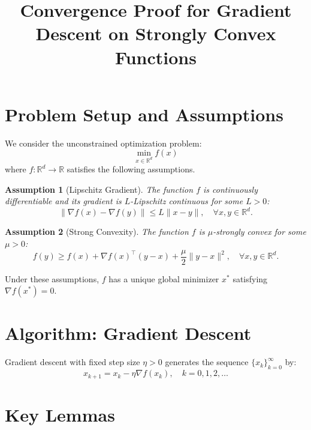 \documentclass{article}
\title{Convergence Proof for Gradient Descent on Strongly Convex Functions}
\author{}
\newtheorem{assumption}{Assumption}
\begin{document}
\maketitle

\section{Problem Setup and Assumptions}

We consider the unconstrained optimization problem:
\begin{equation}
    \min_{x \in \mathbb{R}^d} f(x)
\end{equation}
where $f: \mathbb{R}^d \to \mathbb{R}$ satisfies the following assumptions.

\begin{assumption}[Lipschitz Gradient] \label{assump:lipschitz}
    The function $f$ is continuously differentiable and its gradient is $L$-Lipschitz continuous for some $L > 0$:
    \begin{equation}
        \|\nabla f(x) - \nabla f(y)\| \le L \|x - y\|, \quad \forall x, y \in \mathbb{R}^d.
    \end{equation}
\end{assumption}

\begin{assumption}[Strong Convexity] \label{assump:strong_convex}
    The function $f$ is $\mu$-strongly convex for some $\mu > 0$:
    \begin{equation}
        f(y) \ge f(x) + \nabla f(x)^\top (y - x) + \frac{\mu}{2} \|y - x\|^2, \quad \forall x, y \in \mathbb{R}^d.
    \end{equation}
\end{assumption}

Under these assumptions, $f$ has a unique global minimizer $x^*$ satisfying $\nabla f(x^*) = 0$.

\section{Algorithm: Gradient Descent}

Gradient descent with fixed step size $\eta > 0$ generates the sequence $\{x_k\}_{k=0}^\infty$ by:
\begin{equation} \label{eq:gd_update}
    x_{k+1} = x_k - \eta \nabla f(x_k), \quad k = 0, 1, 2, \dots
\end{equation}

\section{Key Lemmas}
\end{document}
